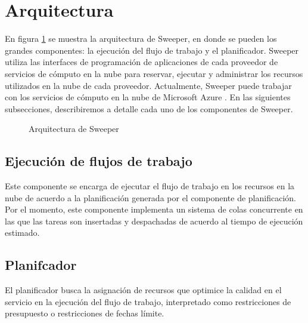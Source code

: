 \section{Arquitectura}

En figura \ref{fig:sweeper-arch} se muestra la arquitectura de Sweeper, en donde se pueden los grandes componentes: la ejecución del flujo de trabajo y el planificador. Sweeper utiliza las interfaces de programación de aplicaciones de cada proveedor de servicios de cómputo en la nube para reservar, ejecutar y administrar los recursos utilizados en la nube de cada proveedor. Actualmente, Sweeper puede trabajar con los servicios de cómputo en la nube de Microsoft Azure \cite{microsoft2015azure}. En las siguientes subsecciones, describiremos a detalle cada uno de los componentes de Sweeper.

\begin{figure}
\begin{center}
\end{center}
\caption{Arquitectura de Sweeper}
\label{fig:sweeper-arch}
\end{figure}


\subsection{Ejecución de flujos de trabajo}

Este componente se encarga de ejecutar el flujo de trabajo en los recursos en la nube de acuerdo a la planificación generada por el componente de planificación. Por el momento, este componente implementa un sistema de colas concurrente en las que las tareas son insertadas y despachadas de acuerdo al tiempo de ejecución estimado.



\subsection{Planifcador}

El planificador busca la asignación de recursos que optimice la calidad en el servicio en la ejecución del flujo de trabajo, interpretado como restricciones de presupuesto o restricciones de fechas límite. 




